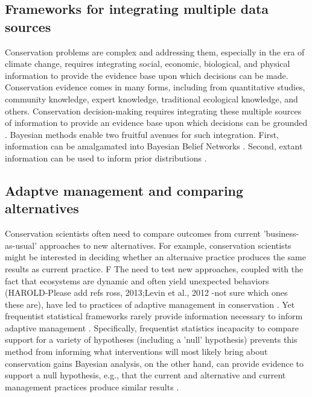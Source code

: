 \documentclass{article}
\begin{document}
\subsection*{Frameworks for integrating multiple data sources}
\par Conservation problems are complex and addressing them, especially in the era of climate change, requires integrating social, economic, biological, and physical information to provide the evidence base upon which decisions can be made. Conservation evidence comes in many forms, including from quantitative studies, community knowledge, expert knowledge, traditional ecological knowledge, and others. Conservation decision-making requires integrating these multiple sources of information to provide an evidence base upon which decisions can be grounded \citep{stern2022interweaving}. Bayesian methods enable two fruitful avenues for such integration. First, information can be amalgamated into Bayesian Belief Networks \citep{marcot2001using,newton2007bayesian}. Second, extant information can be used to inform prior distributions \citep{o2008informed}. 

\subsection*{Adaptve management and comparing alternatives}
\par Conservation scientists often need to compare outcomes from current 'business-as-usual' approaches to new alternatives. For example, conservation scientists might be interested in deciding whether an alternaive practice produces the same results as current practice. F
The need to test new approaches, coupled with the fact that ecosystems are dynamic and often yield unexpected behaviors (HAROLD-Please add refs ross, 2013;Levin et al., 2012 -not sure which ones these are), have led to practices of adaptive management in conservation \citep{holling1978adaptive}. Yet frequentist statistical frameworks rarely provide information necessary to inform adaptive management  \citep{prato2005bayesian}.  Specifically, frequentist statistics incapacity to compare support for a variety of hypotheses (including a 'null' hypothesis) prevents this method from informing what interventions will most likely bring about conservation gains \citep{prato2005bayesian} Bayesian analysis, on the other hand, can provide evidence to support a null hypothesis, e.g., that the current and alternative and current management practices produce similar results \citep{gallistel2009importance}.
\end{document}
